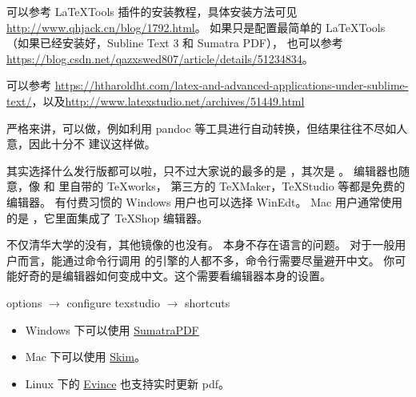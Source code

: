 可以参考 LaTeXTools 插件的安装教程，具体安装方法可见 \url{http://www.qhjack.cn/blog/1792.html}。
如果只是配置最简单的 LaTeXTools （如果已经安装好\TeXLive{}，Subline Text 3 和 Sumatra PDF），
也可以参考 \url{https://blog.csdn.net/qazxswed807/article/details/51234834}。



可以参考 \url{https://htharoldht.com/latex-and-advanced-applications-under-sublime-text/}，以及\url{http://www.latexstudio.net/archives/51449.html}



严格来讲，可以做，例如利用 pandoc 等工具进行自动转换，但结果往往不尽如人意，因此十分不
建议这样做。



其实选择什么发行版都可以啦，只不过大家说的最多的是 \TeXLive{}，其次是 \MiKTeX{}。
编辑器也随意，像 \TeXLive{} 和 \MiKTeX{} 里自带的 TeXworks，
第三方的 TeXMaker，TeXStudio 等都是免费的编辑器。
有付费习惯的 Windows 用户也可以选择 WinEdt。
Mac 用户通常使用的是 \MacTeX{}，它里面集成了 TeXShop 编辑器。



不仅清华大学的没有，其他镜像的也没有。\TeXLive{} 本身不存在语言的问题。
对于一般用户而言，能通过命令行调用 \TeXLive{} 的引擎的人都不多，命令行需要尽量避开中文。
你可能好奇的是编辑器如何变成中文。这个需要看编辑器本身的设置。



options $\to$ configure texstudio $\to$ shortcuts



\begin{itemize}
  \item Windows 下可以使用 \href{https://www.sumatrapdfreader.org/free-pdf-reader.html}{SumatraPDF}
  \item Mac 下可以使用 \href{http://skim-app.sourceforge.net/}{Skim}。
  \item Linux 下的 \href{https://gitlab.gnome.org/GNOME/evince}{Evince} 也支持实时更新 pdf。
\end{itemize}


